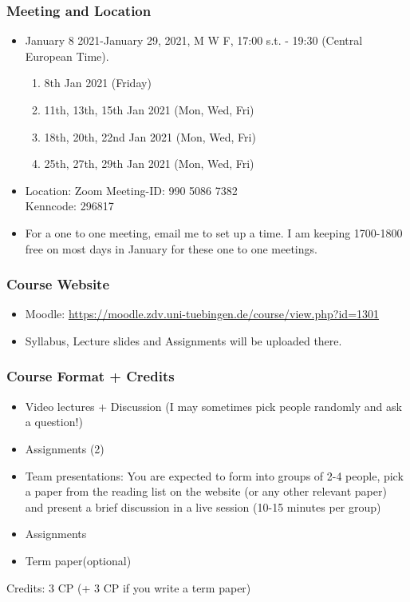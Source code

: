 \documentclass{beamer}
\begin{document}
\begin{frame}
\frametitle{Meeting and Location}
\begin{itemize}
\item January 8 2021-January 29, 2021, M W F, 17:00 s.t. - 19:30 (Central European Time). 
\begin{enumerate}
    \item 8th Jan 2021 (Friday)
    \item 11th, 13th, 15th Jan 2021 (Mon, Wed, Fri)
    \item 18th, 20th, 22nd Jan 2021 (Mon, Wed, Fri)
    \item 25th, 27th, 29th Jan 2021 (Mon, Wed, Fri)
\end{enumerate}
\item Location: Zoom Meeting-ID: 990 5086 7382     \\                                   
Kenncode: 296817    
\item For a one to one meeting, email me to set up a time. I am keeping 1700-1800 free on most days in January for these one to one meetings. 
\end{itemize}
\end{frame}

\begin{frame}
\frametitle{Course Website}
\begin{itemize}
\item Moodle: \url{https://moodle.zdv.uni-tuebingen.de/course/view.php?id=1301}
\item Syllabus, Lecture slides and Assignments will be uploaded there.
\end{itemize}
\end{frame}

\begin{frame}
\frametitle{Course Format + Credits}
\begin{itemize}
\item Video lectures + Discussion (I may sometimes pick people randomly and ask a question!)
\item Assignments (2)
\item Team presentations: You are expected to form into groups of 2-4 people, pick a paper from the reading list on the website (or any other relevant paper) and present a brief discussion in a live session (10-15 minutes per group)
\item Assignments 
\item Term paper(optional)
\end{itemize}
Credits: 3 CP (+ 3 CP if you write a term paper)
\end{frame}
\end{document}
